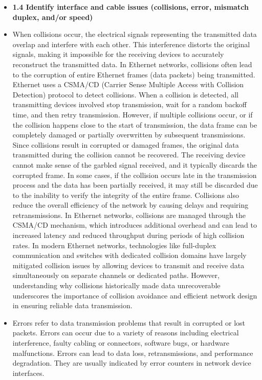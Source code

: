 \documentclass{article}
\begin{document}
\begin{itemize}
  \item \textbf{1.4 Identify interface and cable issues (collisions, error, mismatch duplex, and/or speed)}
  	\item[] When collisions occur, the electrical signals representing the transmitted data overlap and interfere with each other. This interference distorts the original signals, making it impossible for the receiving devices to accurately reconstruct the transmitted data. In Ethernet networks, collisions often lead to the corruption of entire Ethernet frames (data packets) being transmitted. Ethernet uses a CSMA/CD (Carrier Sense Multiple Access with Collision Detection) protocol to detect collisions. When a collision is detected, all transmitting devices involved stop transmission, wait for a random backoff time, and then retry transmission. However, if multiple collisions occur, or if the collision happens close to the start of transmission, the data frame can be completely damaged or partially overwritten by subsequent transmissions. Since collisions result in corrupted or damaged frames, the original data transmitted during the collision cannot be recovered. The receiving device cannot make sense of the garbled signal received, and it typically discards the corrupted frame. In some cases, if the collision occurs late in the transmission process and the data has been partially received, it may still be discarded due to the inability to verify the integrity of the entire frame. Collisions also reduce the overall efficiency of the network by causing delays and requiring retransmissions. In Ethernet networks, collisions are managed through the CSMA/CD mechanism, which introduces additional overhead and can lead to increased latency and reduced throughput during periods of high collision rates. In modern Ethernet networks, technologies like full-duplex communication and switches with dedicated collision domains have largely mitigated collision issues by allowing devices to transmit and receive data simultaneously on separate channels or dedicated paths. However, understanding why collisions historically made data unrecoverable underscores the importance of collision avoidance and efficient network design in ensuring reliable data transmission.
  	\item[] Errors refer to data transmission problems that result in corrupted or lost packets. Errors can occur due to a variety of reasons including electrical interference, faulty cabling or connectors, software bugs, or hardware malfunctions. Errors can lead to data loss, retransmissions, and performance degradation. They are usually indicated by error counters in network device interfaces.

\end{itemize}
\end{document}
